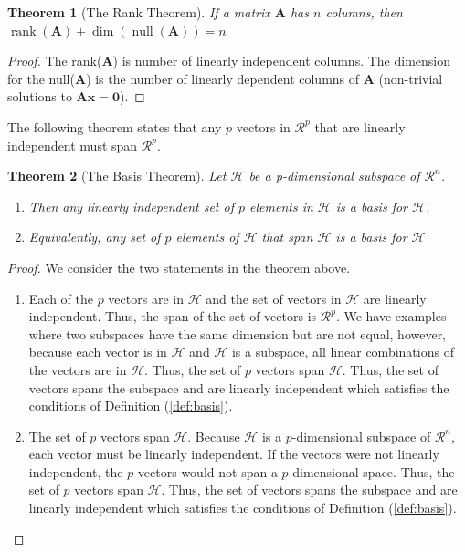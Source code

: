 \documentclass[
]{book}
\newtheorem{theorem}{Theorem}[chapter]
\theoremstyle{definition}
\theoremstyle{definition}
\theoremstyle{definition}
\theoremstyle{definition}
\theoremstyle{remark}
\begin{document}
\begin{theorem}[The Rank Theorem]
If a matrix \(\mathbf{A}\) has \(n\) columns, then \(\operatorname{rank}(\mathbf{A}) + \operatorname{dim}(\operatorname{null}(\mathbf{A})) = n\)
\end{theorem}

\begin{proof}
The rank(\(\mathbf{A}\)) is number of linearly independent columns. The dimension for the null(\(\mathbf{A}\)) is the number of linearly dependent columns of \(\mathbf{A}\) (non-trivial solutions to \(\mathbf{A}\mathbf{x}=\mathbf{0}\)).
\end{proof}

The following theorem states that any \(p\) vectors in \(\mathcal{R}^p\) that are linearly independent must span \(\mathcal{R}^p\).

\begin{theorem}[The Basis Theorem]

Let \(\mathcal{H}\) be a p-dimensional subspace of \(\mathcal{R}^n\).

\begin{enumerate}
\def\labelenumi{\arabic{enumi})}
\item
  Then any linearly independent set of \(p\) elements in \(\mathcal{H}\) is a basis for \(\mathcal{H}\).
\item
  Equivalently, any set of \(p\) elements of \(\mathcal{H}\) that span \(\mathcal{H}\) is a basis for \(\mathcal{H}\)
\end{enumerate}

\end{theorem}

\begin{proof}

We consider the two statements in the theorem above.

\begin{enumerate}
\def\labelenumi{\arabic{enumi})}
\item
  Each of the \(p\) vectors are in \(\mathcal{H}\) and the set of vectors in \(\mathcal{H}\) are linearly independent. Thus, the span of the set of vectors is \(\mathcal{R}^p\). We have examples where two subspaces have the same dimension but are not equal, however, because each vector is in \(\mathcal{H}\) and \(\mathcal{H}\) is a subspace, all linear combinations of the vectors are in \(\mathcal{H}\). Thus, the set of \(p\) vectors span \(\mathcal{H}\). Thus, the set of vectors spans the subspace and are linearly independent which satisfies the conditions of Definition (\ref{def:basis}).
\item
  The set of \(p\) vectors span \(\mathcal{H}\). Because \(\mathcal{H}\) is a \(p\)-dimensional subspace of \(\mathcal{R}^n\), each vector must be linearly independent. If the vectors were not linearly independent, the \(p\) vectors would not span a \(p\)-dimensional space. Thus, the set of \(p\) vectors span \(\mathcal{H}\). Thus, the set of vectors spans the subspace and are linearly independent which satisfies the conditions of Definition (\ref{def:basis}).
\end{enumerate}

\end{proof}
\end{document}
